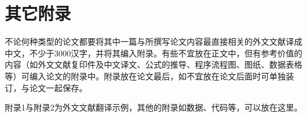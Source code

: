 
\chapter{其它附录}

不论何种类型的论文都要将其中一篇与所撰写论文内容最直接相关的外文文献译成中文，不少于3000汉字，并将其编入附录。有些不宜放在正文中，但有参考价值的内容（如外文文献复印件及中文译文、公式的推导、程序流程图、图纸、数据表格等）可编入论文的附录中。附录放在论文最后，如不宜放在论文后面时可单独装订，与论文一起保存。

附录1与附录2为外文文献翻译示例，其他的附录如数据、代码等，可以放在这里。
